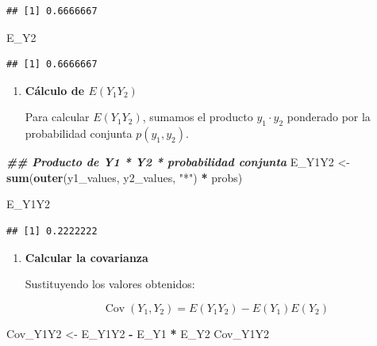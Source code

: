 \documentclass[
]{article}
\newenvironment{Shaded}{\begin{snugshade}}{\end{snugshade}}
\newcommand{\DocumentationTok}[1]{\textcolor[rgb]{0.56,0.35,0.01}{\textbf{\textit{#1}}}}
\newcommand{\FunctionTok}[1]{\textcolor[rgb]{0.13,0.29,0.53}{\textbf{#1}}}
\newcommand{\NormalTok}[1]{#1}
\newcommand{\OtherTok}[1]{\textcolor[rgb]{0.56,0.35,0.01}{#1}}
\newcommand{\SpecialCharTok}[1]{\textcolor[rgb]{0.81,0.36,0.00}{\textbf{#1}}}
\newcommand{\StringTok}[1]{\textcolor[rgb]{0.31,0.60,0.02}{#1}}
\begin{document}
\begin{verbatim}
## [1] 0.6666667
\end{verbatim}

\begin{Shaded}
\begin{Highlighting}[]
\NormalTok{   E\_Y2}
\end{Highlighting}
\end{Shaded}

\begin{verbatim}
## [1] 0.6666667
\end{verbatim}

\begin{enumerate}
\def\labelenumi{\arabic{enumi}.}
\setcounter{enumi}{1}
\item
  \textbf{Cálculo de \(E(Y_1 Y_2)\)}

  Para calcular \(E(Y_1 Y_2)\), sumamos el producto \(y_1 \cdot y_2\) ponderado por la probabilidad conjunta \(p(y_1, y_2)\).
\end{enumerate}

\begin{Shaded}
\begin{Highlighting}[]
   \DocumentationTok{\#\# Producto de Y1 * Y2 * probabilidad conjunta}
\NormalTok{   E\_Y1Y2 }\OtherTok{\textless{}{-}} \FunctionTok{sum}\NormalTok{(}\FunctionTok{outer}\NormalTok{(y1\_values, y2\_values, }\StringTok{"*"}\NormalTok{) }\SpecialCharTok{*}\NormalTok{ probs)}
   
\NormalTok{   E\_Y1Y2}
\end{Highlighting}
\end{Shaded}

\begin{verbatim}
## [1] 0.2222222
\end{verbatim}

\begin{enumerate}
\def\labelenumi{\arabic{enumi}.}
\setcounter{enumi}{2}
\item
  \textbf{Calcular la covarianza}

  Sustituyendo los valores obtenidos:

  \[ \operatorname{Cov}(Y_1, Y_2) = E(Y_1 Y_2) - E(Y_1)E(Y_2) \]
\end{enumerate}

\begin{Shaded}
\begin{Highlighting}[]
\NormalTok{   Cov\_Y1Y2 }\OtherTok{\textless{}{-}}\NormalTok{ E\_Y1Y2 }\SpecialCharTok{{-}}\NormalTok{ E\_Y1 }\SpecialCharTok{*}\NormalTok{ E\_Y2}
\NormalTok{   Cov\_Y1Y2}
\end{Highlighting}
\end{Shaded}
\end{document}
